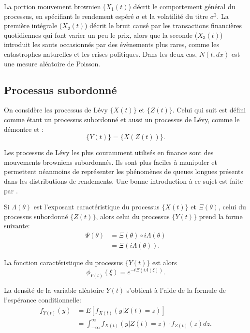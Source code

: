 La portion mouvement brownien ($X_1(t)$) décrit le comportement
général du processus, en spécifiant le rendement espéré $a$ et la
volatilité du titre $\sigma^2$. La première intégrale ($X_2(t)$)
décrit le bruit causé par les transactions financières quotidiennes
qui font varier un peu le prix, alors que la seconde ($X_3(t)$)
introduit les sauts occasionnés par des évènements plus rares, comme
les catastrophes naturelles et les crises politiques. Dans les deux
cas, $N(t,dx)$ est une mesure aléatoire de Poisson.

\subsection{Processus subordonné}
\label{sec:procsubordonne}

On considère les processus de Lévy $\lbrace X(t) \rbrace$ et $\lbrace
Z(t) \rbrace$. Celui qui suit est défini comme étant un processus
subordonné et aussi un processus de Lévy, comme le démontre
\cite{sato1999levy} et \cite{schoutens2003levy}:
\begin{equation}
  \label{eq:processussubordonne}
  \lbrace Y(t) \rbrace = \lbrace X\left(Z(t)\right) \rbrace.
\end{equation}

Les processus de Lévy les plus couramment utilisés en finance sont des
mouvements browniens subordonnés. Ils sont plus faciles à manipuler et
permettent néanmoins de représenter les phénomènes de queues longues
présents dans les distributions de rendements. Une bonne introduction
à ce sujet est faite par \cite{kyprianou2007introductory}.

Si $\Lambda(\theta)$ est l'exposant caractéristique du processus
$\lbrace X(t)\rbrace$ et $\Xi(\theta)$, celui du processus subordonné
$\lbrace Z(t)\rbrace$, alors celui du processus $\lbrace Y(t)\rbrace$
prend la forme suivante:
\begin{align}
  \label{eq:exposantcaractYt}
  \Psi(\theta) &= \Xi(\theta)\circ i\Lambda(\theta) \nonumber\\
  &= \Xi(i\Lambda(\theta)).
\end{align}

La fonction caractéristique du processus $\lbrace Y(t) \rbrace$ est
alors
\begin{equation}
  \label{eq:fncaractYt}
  \phi_{Y(t)}(\xi) = e^{-t\Xi(i\Lambda(\xi))}.
\end{equation}

La densité de la variable aléatoire $Y(t)$ s'obtient à l'aide de la
formule de l'espérance conditionnelle:
\begin{align}
  f_{Y(t)}(y) &= E\left[ f_{X(t)}(y|Z(t)=z) \right] \nonumber\\
  &= \int_{-\infty}^{\infty} f_{X(t)}(y|Z(t)=z) \cdot f_{Z(t)}(z)
  dz \label{eq:densiteprocessusyt}.
\end{align}

